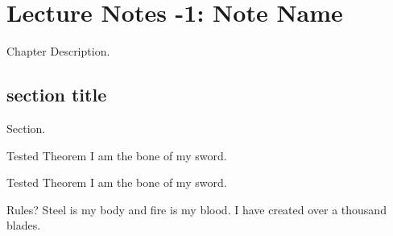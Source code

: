 \chapter{Lecture Notes -1: Note Name}
Chapter Description.
\section{section title}
Section.
\begin{ln-theorem}{Tested Theorem}{}
    I am the bone of my sword.
\end{ln-theorem}
\begin{ln-define}{Tested Theorem}{}
    I am the bone of my sword.
\end{ln-define}
\begin{ln-quest}{Rules?}{}
    Steel is my body and fire is my blood.
    \tcblower
    I have created over a thousand blades.
\end{ln-quest}